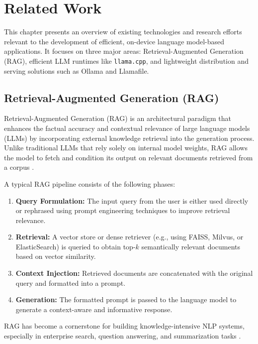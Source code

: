 \chapter{Related Work}

This chapter presents an overview of existing technologies and research efforts relevant to the development of efficient, on-device language model-based applications. It focuses on three major areas: Retrieval-Augmented Generation (RAG), efficient LLM runtimes like \texttt{llama.cpp}, and lightweight distribution and serving solutions such as Ollama and Llamafile.

\section{Retrieval-Augmented Generation (RAG)}

Retrieval-Augmented Generation (RAG) is an architectural paradigm that enhances the factual accuracy and contextual relevance of large language models (LLMs) by incorporating external knowledge retrieval into the generation process. Unlike traditional LLMs that rely solely on internal model weights, RAG allows the model to fetch and condition its output on relevant documents retrieved from a corpus \cite{lewis2021retrieval}.

A typical RAG pipeline consists of the following phases:

\begin{enumerate}
    \item \textbf{Query Formulation:} The input query from the user is either used directly or rephrased using prompt engineering techniques to improve retrieval relevance.
    \item \textbf{Retrieval:} A vector store or dense retriever (e.g., using FAISS, Milvus, or ElasticSearch) is queried to obtain top-$k$ semantically relevant documents based on vector similarity.
    \item \textbf{Context Injection:} Retrieved documents are concatenated with the original query and formatted into a prompt.
    \item \textbf{Generation:} The formatted prompt is passed to the language model to generate a context-aware and informative response.
\end{enumerate}

RAG has become a cornerstone for building knowledge-intensive NLP systems, especially in enterprise search, question answering, and summarization tasks \cite{rag_blog, langchain_rag}.

